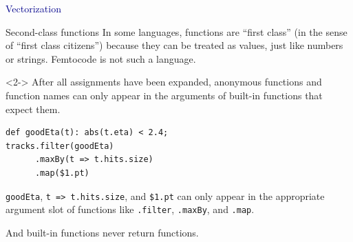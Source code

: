 \documentclass{beamer}
\begin{document}
\begin{frame}{}
\begin{center}
\textcolor{darkblue}{\huge Vectorization}
\end{center}
\end{frame}

\begin{frame}[fragile]{Second-class functions}
\vspace{0.5 cm}
In some languages, functions are ``first class'' (in the sense of ``first class citizens'') because they can be treated as values, just like numbers or strings. Femtocode is not such a language.

\vspace{0.5 cm}
\begin{uncoverenv}<2->
After all assignments have been expanded, anonymous functions and function names can only appear in the arguments of built-in functions that expect them.

\begin{center}
\begin{minipage}{0.9\linewidth}
\small
\begin{verbatim}
def goodEta(t): abs(t.eta) < 2.4;
tracks.filter(goodEta)
      .maxBy(t => t.hits.size)
      .map($1.pt)
\end{verbatim}
\end{minipage}
\end{center}

{\tt goodEta}, {\tt t => t.hits.size}, and {\tt \$1.pt} can only appear in the appropriate argument slot of functions like {\tt .filter}, {\tt .maxBy}, and {\tt .map}.

\vspace{0.5 cm}
And built-in functions never return functions.
\end{uncoverenv}
\end{frame}
\end{document}
